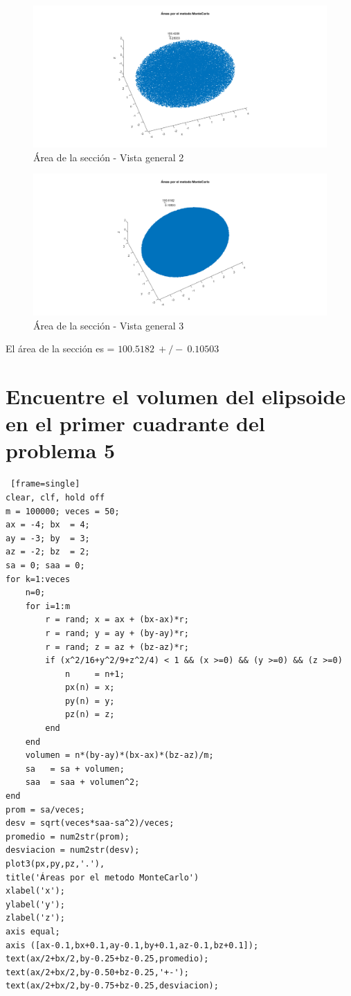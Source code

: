 \documentclass{article}
\begin{document}
\begin{figure}[H]
\centering
    \includegraphics[width=1\textwidth]{images/FIG05B.png}
    \caption{Área de la sección - Vista general 2}
\end{figure}

\clearpage
\newpage

\begin{figure}[H]
\centering
    \includegraphics[width=1\textwidth]{images/FIG05C.png}
    \caption{Área de la sección - Vista general 3}
\end{figure}

El área de la sección es = $100.5182~+/-~0.10503$

\section{Encuentre el volumen del elipsoide en el primer cuadrante del problema 5}

\begin{lstlisting} [frame=single]
clear, clf, hold off
m = 100000; veces = 50;
ax = -4; bx  = 4;
ay = -3; by  = 3;
az = -2; bz  = 2; 
sa = 0; saa = 0;
for k=1:veces
    n=0;
    for i=1:m
        r = rand; x = ax + (bx-ax)*r;
        r = rand; y = ay + (by-ay)*r;
        r = rand; z = az + (bz-az)*r;
        if (x^2/16+y^2/9+z^2/4) < 1 && (x >=0) && (y >=0) && (z >=0) 
            n     = n+1;
            px(n) = x; 
            py(n) = y;
            pz(n) = z;
        end
    end
    volumen = n*(by-ay)*(bx-ax)*(bz-az)/m;
    sa   = sa + volumen;
    saa  = saa + volumen^2;
end
prom = sa/veces;
desv = sqrt(veces*saa-sa^2)/veces;
promedio = num2str(prom);
desviacion = num2str(desv);
plot3(px,py,pz,'.'),
title('Áreas por el metodo MonteCarlo') 
xlabel('x');
ylabel('y');
zlabel('z');
axis equal;
axis ([ax-0.1,bx+0.1,ay-0.1,by+0.1,az-0.1,bz+0.1]);
text(ax/2+bx/2,by-0.25+bz-0.25,promedio);
text(ax/2+bx/2,by-0.50+bz-0.25,'+-');
text(ax/2+bx/2,by-0.75+bz-0.25,desviacion);
\end{lstlisting}
\end{document}
